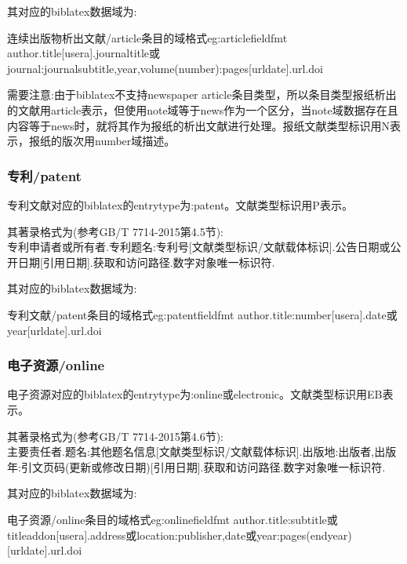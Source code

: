 \documentclass[11pt]{article} %
\begin{document}
其对应的biblatex数据域为:
\begin{codetex}{连续出版物析出文献/article条目的域格式}{eg:articlefieldfmt}
author.title[usera].journaltitle或journal:journalsubtitle,year,volume(number):pages[urldate].url.doi
\end{codetex}

需要注意:由于biblatex不支持newspaper article条目类型，所以条目类型报纸析出的文献用article表示，但使用note域等于news作为一个区分，当note域数据存在且内容等于news时，就将其作为报纸的析出文献进行处理。报纸文献类型标识用N表示，报纸的版次用number域描述。

\subsubsection{专利/patent}
\begin{refentry}{}{}
专利文献对应的biblatex的entrytype为:patent。文献类型标识用P表示。

其著录格式为(参考GB/T 7714-2015第4.5节):\\
专利申请者或所有者.专利题名:专利号[文献类型标识/文献载体标识].公告日期或公开日期[引用日期].获取和访问路径.数字对象唯一标识符.
\end{refentry}

其对应的biblatex数据域为:
\begin{codetex}{专利文献/patent条目的域格式}{eg:patentfieldfmt}
author.title:number[usera].date或year[urldate].url.doi
\end{codetex}

\subsubsection{电子资源/online}
\begin{refentry}{}{}
电子资源对应的biblatex的entrytype为:online或electronic。文献类型标识用EB表示。

其著录格式为(参考GB/T 7714-2015第4.6节):\\
主要责任者.题名:其他题名信息[文献类型标识/文献载体标识].出版地:出版者,出版年:引文页码(更新或修改日期)[引用日期].获取和访问路径.数字对象唯一标识符.
\end{refentry}

其对应的biblatex数据域为:
\begin{codetex}{电子资源/online条目的域格式}{eg:onlinefieldfmt}
author.title:subtitle或titleaddon[usera].address或location:publisher,date或year:pages(endyear)[urldate].url.doi
\end{codetex}
\end{document}
